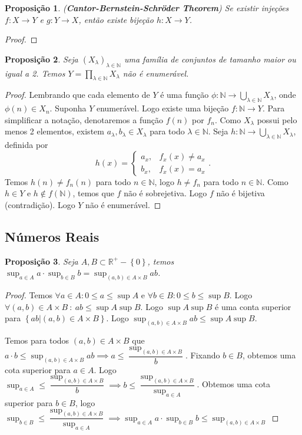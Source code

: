 \documentclass{article}
\theoremstyle{plain}
\newtheorem{prop}{Proposição}[section]
\theoremstyle{definition}
\theoremstyle{remark}
\begin{document}
\begin{prop}
	(\textbf{Cantor-Bernstein-Schröder Theorem}) Se existir injeções $f:X\to Y$ e $g: Y \to X$, então existe bijeção $h:X\to Y$.
\end{prop}
\begin{proof}
\end{proof}
\begin{prop}
	Seja $(X_{\lambda})_{\lambda \in \mathbb{N}}$ uma família de conjuntos de tamanho maior ou igual a 2. Temos $Y = \displaystyle\prod_{\lambda \in \mathbb{N}} X_{\lambda}$ não é enumerável.
\end{prop}
\begin{proof}
	Lembrando que cada elemento de $Y$ é uma função $\phi: \mathbb{N} \to\displaystyle\bigcup_{\lambda \in \mathbb{N}} X_{\lambda}$, onde $\phi(n) \in X_n$. Suponha $Y$ enumerável. Logo existe uma bijeção $f: \mathbb{N} \to Y$. Para simplificar a notação, denotaremos a função $f(n)$ por $f_n$.  Como $X_{\lambda}$ possui pelo menos 2 elementos, existem $a_\lambda, b_\lambda \in X_{\lambda}$ para todo $\lambda\in \mathbb{N}$. Seja $h: \mathbb{N} \to \displaystyle\bigcup_{\lambda \in \mathbb{N}} X_{\lambda}$, definida por $$h(x) = \begin{cases} a_x , & f_x(x) \neq a_x\\ b_x, & f_x(x) = a_x \end{cases}.$$
		Temos $h(n) \neq f_n(n)$ para todo $n\in \mathbb{N}$, logo $h \neq f_n$ para todo $n\in \mathbb{N}$. Como $h\in Y$ e $h \not \in f(\mathbb{N})$, temos que $f$ não é sobrejetiva. Logo $f$ não é bijetiva (contradição). Logo $Y$ não é enumerável.
\end{proof}
\subsection{Números Reais}

\begin{prop}
	Seja $A,B\subset \mathbb{R}^{+}-\left\{0\right\}$, temos $\displaystyle\sup_{a\in A } a \cdot \displaystyle\sup_{b\in B} b = \displaystyle\sup_{(a,b)\in A\times B} ab$.
\end{prop}
\begin{proof}
	Temos $\forall a \in A : 0 \leq a \leq \sup A$ e $\forall b \in B : 0\leq b \leq \sup B$. Logo $\forall (a,b)\in A\times B \: : \: ab \leq \sup A \sup B$. Logo $\sup A \sup B$ é uma conta superior para $\left\{ ab | (a,b) \in A\times B \right\}$. Logo $\sup_{(a,b) \in A\times B} ab \leq \sup A \sup B$.

Temos para todos $(a,b)\in A\times B$ que $a\cdot b \leq \sup_{(a,b)\in A\times B} ab \implies a \leq \dfrac{\sup_{(a,b)\in A\times B}}{b}$. Fixando $b \in B$, obtemos uma cota superior para $a\in A$. Logo $\sup_{a\in A} \leq \dfrac{\sup_{(a,b)\in A\times B}}{b} \implies  b \leq \dfrac{\sup_{(a,b)\in A\times B}}{\sup_{a\in A} }$. Obtemos uma cota superior para $b\in B$, logo $\sup_{b\in B} \leq \dfrac{\sup_{(a,b)\in A\times B}}{\sup_{a\in A} } \implies \sup_{a\in A } a \cdot \sup_{b\in B} b \leq \sup_{(a,b)\in A\times B} $
\end{proof}
\end{document}
